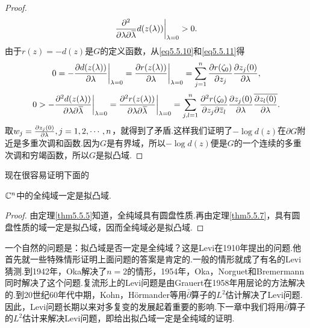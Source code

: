 \begin{proof}
\begin{equation}
	\frac{\partial^2 }{\partial \lambda\partial {}\mkern1mu\overline{\mkern-1mu\lambda}}d(z(\lambda))\bigg|_{\lambda=0}>0.
\end{equation}
由于$r(z)=-d(z)$是$G$的定义函数，从\eqref{eq5.5.10}和\eqref{eq5.5.11}得
\[0=-\frac{\partial d(z(\lambda))}{\partial \lambda}\bigg|_{\lambda=0}=\frac{\partial r(z(\lambda))}{\partial \lambda}\bigg|_{\lambda=0}=\sum_{j=1}^{n}\frac{\partial r(\zeta_0)}{\partial z_j}\frac{\partial z_j(0)}{\partial \lambda},\]
\[0>-\frac{\partial^2 d(z(\lambda))}{\partial \lambda\partial {}\mkern1mu\overline{\mkern-1mu\lambda}}\bigg|_{\lambda=0}=\frac{\partial^2 r(z(\lambda))}{\partial \lambda\partial {}\mkern1mu\overline{\mkern-1mu\lambda}}\bigg|_{\lambda=0}=\sum_{j,l=1}^{n}\frac{\partial^2 r(\zeta_0)}{\partial z_j\partial {}\mkern1mu\overline{\mkern-1muz}_l}\frac{\partial z_j(0)}{\partial \lambda}{}\mkern1mu\overline{\mkern-1mu\frac{\partial z_l(0)}{\partial \lambda}}.\]
取$w_j=\frac{\partial z_j(0)}{\partial \lambda},j=1,2,\cdots,n$，就得到了矛盾.这样我们证明了$-\log d(z)$在$\partial G$附近是多重次调和函数.因为$G$是有界域，所以$-\log d(z)$便是$G$的一个连续的多重次调和穷竭函数，所以$G$是拟凸域.
\end{proof}
现在很容易证明下面的
\begin{theorem}\label{thm5.5.9}
	$\mathbb C^n$中的全纯域一定是拟凸域.
\end{theorem}
\begin{proof}
	由定理\ref{thm5.5.5}知道，全纯域具有圆盘性质.再由定理\ref{thm5.5.7}，具有圆盘性质的域一定是拟凸域，因而全纯域必是拟凸域.
\end{proof}
一个自然的问题是：拟凸域是否一定是全纯域？这是Levi在1910年提出的问题.他首先就一些特殊情形证明上面问题的答案是肯定的.一般的情形就成了有名的Levi猜测.到1942年，Oka解决了$n=2$的情形，1954年，Oka，Norguet和Bremermann同时解决了这个问题.复流形上的Levi问题是由Grauert在1958年用层论的方法解决的.到20世纪60年代中期，Kohn，H\"ormander等用$\bar{\partial}$算子的$L^2$估计解决了Levi问题.因此，Levi问题长期以来对多复变的发展起着重要的影响.下一章中我们将用$\bar{\partial}$算子的$L^2$估计来解决Levi问题，即给出拟凸域一定是全纯域的证明.
